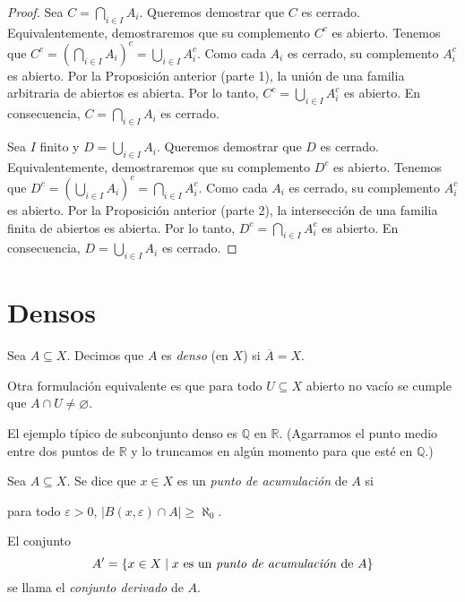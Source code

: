 \begin{proof}
	 Sea $C = \bigcap_{i \in I} A_i$. Queremos demostrar que $C$ es cerrado. Equivalentemente, demostraremos que su complemento $C^c$ es abierto. Tenemos que $C^c = (\bigcap_{i \in I} A_i)^c = \bigcup_{i \in I} A_i^c$. Como cada $A_i$ es cerrado, su complemento $A_i^c$ es abierto. Por la Proposición anterior (parte 1), la unión de una familia arbitraria de abiertos es abierta. Por lo tanto, $C^c = \bigcup_{i \in I} A_i^c$ es abierto. En consecuencia, $C = \bigcap_{i \in I} A_i$ es cerrado.

	 Sea $I$ finito y $D = \bigcup_{i \in I} A_i$. Queremos demostrar que $D$ es cerrado. Equivalentemente, demostraremos que su complemento $D^c$ es abierto. Tenemos que $D^c = (\bigcup_{i \in I} A_i)^c = \bigcap_{i \in I} A_i^c$. Como cada $A_i$ es cerrado, su complemento $A_i^c$ es abierto. Por la Proposición anterior (parte 2), la intersección de una familia finita de abiertos es abierta. Por lo tanto, $D^c = \bigcap_{i \in I} A_i^c$ es abierto. En consecuencia, $D = \bigcup_{i \in I} A_i$ es cerrado.
\end{proof}


\section{Densos}

\begin{definition}
	Sea $A \subseteq X$. Decimos que $A$ es \emph{denso} (en $X$) si $\overline{A} = X$.
\end{definition}

\begin{remark}
	Otra formulación equivalente es que para todo $U \subseteq X$ abierto no vacío se cumple que $A \cap U \neq \varnothing$.
\end{remark}

El ejemplo típico de subconjunto denso es $\mathbb{Q}$ en $\mathbb{R}$. (Agarramos el punto medio entre dos puntos de $\mathbb{R}$ y lo truncamos en algún momento para que esté en $\mathbb{Q}$.)

\begin{definition}
	Sea $A \subseteq X$. Se dice que $x \in X$ es un \emph{punto de acumulación} de $A$ si
	\begin{center}
		para todo $\varepsilon > 0$, $\left| B(x, \varepsilon) \cap A \right| \geq \aleph_0$.
	\end{center}
	El conjunto
	$$
		A' = \{ x \in X \mid x \text{ es un \emph{punto de acumulaci\'on} de } A \}
	$$
	se llama el \emph{conjunto derivado} de $A$.
\end{definition}

